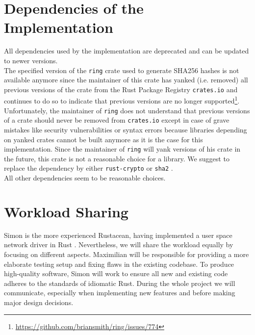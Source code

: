 \documentclass[a4paper, 11pt]{article}
\begin{document}
\section*{Dependencies of the Implementation}
All dependencies used by the implementation are deprecated and can be updated to newer versions.\\
The specified version of the \texttt{ring} \cite{CratesIORing} crate used to generate SHA256 hashes is not available anymore since the maintainer of this crate has yanked (i.e. removed) all previous versions of the crate from the Rust Package Registry \texttt{crates.io} \cite{CratesIO} and continues to do so to indicate that previous versions are no longer supported\footnote{\url{https://github.com/briansmith/ring/issues/774}}.
Unfortunately, the maintainer of \texttt{ring} does not understand that previous versions of a crate should never be removed from \texttt{crates.io} except in case of grave mistakes like security vulnerabilities or syntax errors because libraries depending on yanked crates cannot be built anymore as it is the case for this implementation.
Since the maintainer of \texttt{ring} will yank versions of his crate in the future, this crate is not a reasonable choice for a library.
We suggest to replace the dependency by either \texttt{rust-crypto} \cite{CratesIOCrypto} or \texttt{sha2} \cite{CratesIOSha2}.\\
All other dependencies seem to be reasonable choices.

\section*{Workload Sharing}
Simon is the more experienced Rustacean, having implemented a user space network driver in Rust \cite{Ixy}.
Nevertheless, we will share the workload equally by focusing on different aspects. 
Maximilian will be responsible for providing a more elaborate testing setup and fixing flaws in the existing codebase. 
To produce high-quality software, Simon will work to ensure all new and existing code adheres to the standards of idiomatic Rust.
During the whole project we will communicate, especially when implementing new features and before making major design decisions.



\end{document}
